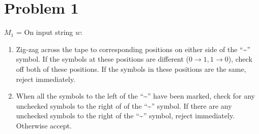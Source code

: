 \documentclass{article}
\newenvironment{problem}[1]{
  \nobreak\section*{Problem #1}
}{}
\begin{document}
  \begin{problem}{1}
    $M_1$ = On input string $w$:  \begin{enumerate}
      \item Zig-zag across the tape to corresponding positions on
      either side of the ``\~{}'' symbol.  If the symbols at these
      positions are different ($0 \to 1, 1 \to 0$), check off both
      of these positions.  If the symbols in these positions are the
      same, reject immediately.

      \item When all the symbols to the left of the ``\~{}'' have been
      marked, check for any unchecked symbols to the right of of the
      ``\~{}'' symbol.  If there are any unchecked symbols to the right
      of the ``\~{}'' symbol, reject immediately.  Otherwise accept.
    \end{enumerate}
  \end{problem}
\end{document}
